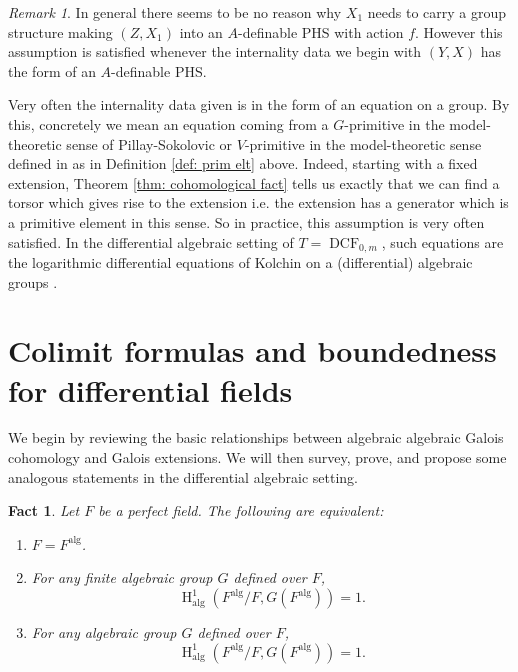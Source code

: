 \documentclass{amsart}
\newtheorem{fact}[theorem]{Fact}
\theoremstyle{definition}
\theoremstyle{remark}
\newtheorem{remark}[theorem]{Remark}
\numberwithin{equation}{section}
\def \HH {\operatorname{H}}
\def \alg {\operatorname{alg}}
\def \DCF {\operatorname{DCF}}
\begin{document}
\begin{remark}\label{rmk: assmp ii}
In general there seems to be no reason why $X_1$ needs to carry a group structure making $(Z,X_1)$ into an $A$-definable PHS with action $f$. However this assumption is satisfied whenever the internality data we begin with $(Y,X)$ has the form of an $A$-definable PHS. 

Very often the internality data given is in the form of an equation on a group. By this, concretely we mean an equation coming from a $G$-primitive in the model-theoretic sense of Pillay-Sokolovic or $V$-primitive in the model-theoretic sense defined in \cite{MeretzkyThesis} as in Definition \ref{def: prim elt} above. Indeed, starting with a fixed extension, Theorem \ref{thm: cohomological fact} \cite{OmarDavid2026} tells us exactly that we can find a torsor which gives rise to the extension i.e. the extension has a generator which is a primitive element in this sense.  So in practice, this assumption is very often satisfied. In the differential algebraic setting of $T=\DCF_{0,m}$, such equations are the logarithmic differential equations of Kolchin on a (differential) algebraic groups \cite{OmarDavid2026}. %
\end{remark}%



\section{Colimit formulas and boundedness for differential fields}\label{sec: colim diff}

We begin by reviewing the basic relationships between algebraic algebraic Galois cohomology and Galois extensions. We will then survey, prove, and propose some analogous statements in the differential algebraic setting.  

\begin{fact}\label{fact: alg coh triv} \cite{Serre1979}
    Let $F$ be a perfect field. The following are equivalent:
    
    \begin{enumerate}
        \item $F = F^{\alg}$.
        \item For any finite algebraic group $G$ defined over $F$, $$\HH^1_{\alg}(F^{\alg}/F,G(F^{\alg})) = 1.$$
        \item For any algebraic group $G$ defined over $F$, $$\HH^1_{\alg}(F^{\alg}/F,G(F^{\alg})) = 1.$$
    \end{enumerate}
\end{fact}
\end{document}
